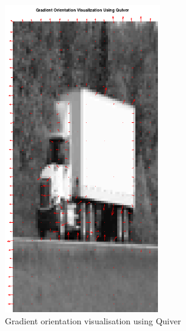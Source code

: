 \documentclass[a4paper]{article}
\begin{document}
\begin{minipage}{0.49\textwidth}
\begin{figure}[H]
    \centering
    \includegraphics[width=0.6\textwidth]{./images/3_gradient_orientation.png}
    \caption{Gradient orientation visualisation using Quiver}
\end{figure}
\end{minipage}
\hfill
\end{document}
